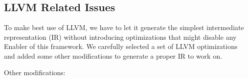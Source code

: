 



\subsection{LLVM Related Issues}

To make best use of LLVM, we have to let it generate the simplest
intermediate representation (IR) without introducing optimizations that
might disable any Enabler of this framework. We carefully selected a set of
LLVM optimizations and added some other modifications to generate a proper
IR to work on.

Other modifications:

